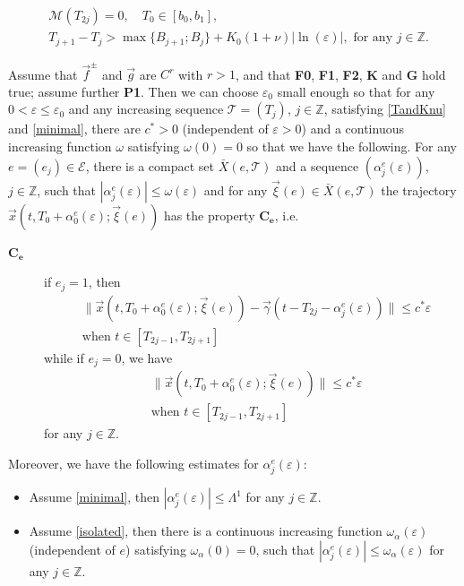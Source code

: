 \documentclass[10pt,a4paper]{amsart}
\def\EE{{\mathcal E}}
\def\MM{{\mathcal M}}
\def\Z{{\mathbb Z}}
\def\al{\alpha}
\def\ee{{e}}
\def\ep{\varepsilon}
\def\f{\vec{f}}
\def\ga{\vec{\gamma}}
\def\g{\vec{g}}
\def\l1{\Lambda^{1}}
\def\xxi{\vec{\xi}}
\def\x{\vec{x}}
\newcommand\assump[1]{{\rm\textbf{#1}}}
\begin{document}
\begin{equation}\label{TandKnunew}
\begin{split}
  &  \MM(T_{2j})=0, \quad T_0 \in [b_0,b_1],\\
& T_{j+1}-T_j >    \max\{ B_{j+1}; B_{j}\}+ K_0 (1+\nu) |\ln(\ep)| ,   \textrm{ for any $j \in \Z$.}
  \end{split}
\end{equation}

\begin{theorem}\label{main.weak1}
	Assume that   $\f^{\pm}$ and $\g$ are $C^r$ with  $r > 1$,   and that \assump{F0}, \assump{F1}, \assump{F2}, \assump{K} and \assump{G} hold true;
assume further    \assump{P1}.
Then we can choose $\ep_0$ small enough so that for any $0< \ep \le \ep_0$
and any increasing sequence $\mathcal{T}=(T_j)$, $j \in \Z$,  satisfying  \eqref{TandKnu} and \eqref{minimal},
 there are $c^*>0$ (independent of $\ep>0$) and  a continuous increasing function $\omega$ satisfying
  $\omega(0)=0$
so that we have the following.
For any $\ee=(\ee_j) \in \EE$,
there is a compact set $\bar{X}(\ee, \mathcal{T})$ and a sequence $(\al_j^{\ee}(\ep))$, $j \in \Z$,
such that $|\al_j^{\ee}(\ep)| \le \omega(\ep)$ and for any $\xxi(\ee) \in \bar{X}(\ee, \mathcal{T})$
  the trajectory $\x(t,T_0 + \al_0^{\ee}(\ep); \xxi(\ee))$ has the property $\mathbf{C_e}$, i.e.
  \begin{description}
  \item[$\mathbf{C_e}$]
	if $\ee_j=1$, then
	\begin{equation}\label{ej=1w}
	\begin{split}
	&   \|\x(t,T_0+ \al_0^{\ee}(\ep); \xxi(\ee) )-\ga(t-T_{2j}-\al_j^{\ee}(\ep)) \| \le c^*\ep  \\
 & \textrm{when $t \in [T_{2j-1}, T_{2j+1} ]$ }
	\end{split}
	\end{equation}
	while if $\ee_j=0$, we have
	 \begin{equation}\label{ej=0w}
\begin{split}
	&	\|\x(t,T_0+ \al_0^{\ee}(\ep); \xxi(\ee))  \| \le c^*\ep \\
 & \textrm{when $t \in [T_{2j-1}, T_{2j+1} ]$ }
	\end{split}
	\end{equation}
	for any $j \in \Z$.
\end{description}
Moreover, we have the following estimates for $\alpha_j^{\ee}(\ep)$:
\begin{itemize}
  \item  Assume \eqref{minimal}, then $|\alpha_j^{\ee}(\ep)| \le  \l1$ for any $j \in \Z$.
  \item Assume \eqref{isolated}, then there is   a continuous increasing function $\omega_{\alpha}(\ep)$ (independent of $\ee$) satisfying
  $\omega_{\alpha}(0)=0$, such that $|\alpha_j^{\ee}(\ep)| \le \omega_{\alpha}(\ep)$ for any $j \in \Z$.
\end{itemize}
\end{theorem}
\end{document}
